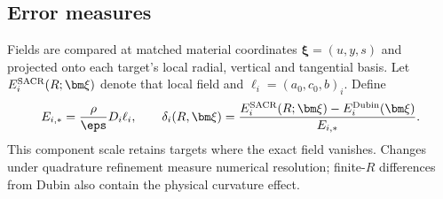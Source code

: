 \subsection{Error measures}
Fields are compared at matched material coordinates $\bm\xi=(u,y,s)$ and projected
onto each target's local radial, vertical and tangential basis. Let
$E_i^{\rm SACR}(R;\bm\xi)$ denote that local field and
$\ell_i=(a_0,c_0,b)_i$. Define
\begin{equation}
 E_{i,*}=\frac{\rho}{\eps}D_i\ell_i,\qquad
 \delta_i(R,\bm\xi)=\frac{E_i^{\rm SACR}(R;\bm\xi)-E_i^{\rm Dubin}(\bm\xi)}{E_{i,*}}.
 \label{eq:sacr-error}
\end{equation}
This component scale retains targets where the exact field vanishes. Changes
under quadrature refinement measure numerical resolution; finite-$R$
differences from Dubin also contain the physical curvature effect.


